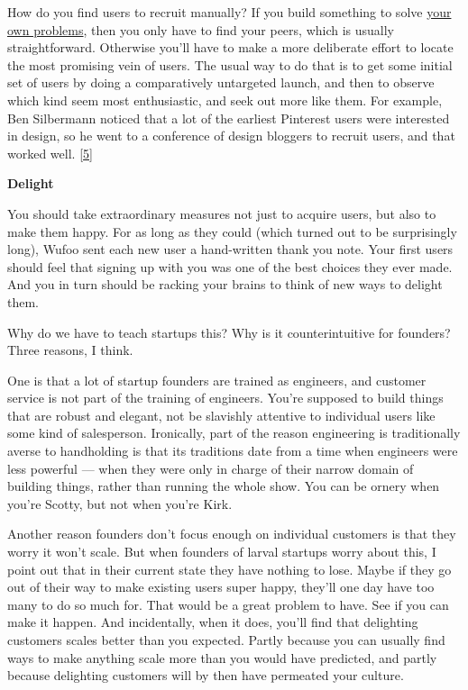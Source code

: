 How do you find users to recruit manually? If you build something to
solve \href{startupideas.html}{your own problems}, then you only have to
find your peers, which is usually straightforward. Otherwise you'll have
to make a more deliberate effort to locate the most promising vein of
users. The usual way to do that is to get some initial set of users by
doing a comparatively untargeted launch, and then to observe which kind
seem most enthusiastic, and seek out more like them. For example, Ben
Silbermann noticed that a lot of the earliest Pinterest users were
interested in design, so he went to a conference of design bloggers to
recruit users, and that worked well. {[}\hyperref[f5n]{5}{]}

\textbf{Delight}

You should take extraordinary measures not just to acquire users, but
also to make them happy. For as long as they could (which turned out to
be surprisingly long), Wufoo sent each new user a hand-written thank you
note. Your first users should feel that signing up with you was one of
the best choices they ever made. And you in turn should be racking your
brains to think of new ways to delight them.

Why do we have to teach startups this? Why is it counterintuitive for
founders? Three reasons, I think.

One is that a lot of startup founders are trained as engineers, and
customer service is not part of the training of engineers. You're
supposed to build things that are robust and elegant, not be slavishly
attentive to individual users like some kind of salesperson. Ironically,
part of the reason engineering is traditionally averse to handholding is
that its traditions date from a time when engineers were less powerful
--- when they were only in charge of their narrow domain of building
things, rather than running the whole show. You can be ornery when
you're Scotty, but not when you're Kirk.

Another reason founders don't focus enough on individual customers is
that they worry it won't scale. But when founders of larval startups
worry about this, I point out that in their current state they have
nothing to lose. Maybe if they go out of their way to make existing
users super happy, they'll one day have too many to do so much for. That
would be a great problem to have. See if you can make it happen. And
incidentally, when it does, you'll find that delighting customers scales
better than you expected. Partly because you can usually find ways to
make anything scale more than you would have predicted, and partly
because delighting customers will by then have permeated your culture.

